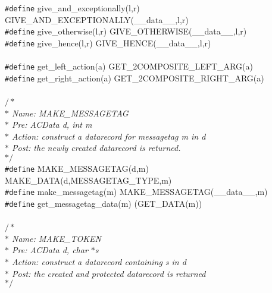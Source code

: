 \begin{flushleft}
{\tt \#define} give\_and\_exceptionally(l,r) GIVE\_AND\_EXCEPTIONALLY(\_\_data\_\_,l,r)\mbox{}\\
{\tt \#define} give\_otherwise(l,r) GIVE\_OTHERWISE(\_\_data\_\_,l,r)\mbox{}\\
{\tt \#define} give\_hence(l,r) GIVE\_HENCE(\_\_data\_\_,l,r)\mbox{}\\
\mbox{}\\
{\tt \#define} get\_left\_action(a) GET\_2COMPOSITE\_LEFT\_ARG(a)\mbox{}\\
{\tt \#define} get\_right\_action(a) GET\_2COMPOSITE\_RIGHT\_ARG(a)\mbox{}\\
\mbox{}\\
{$/\ast$\it{}\mbox{}\\
\hspace*{1\indentation}$\ast$ Name: MAKE\_MESSAGETAG\mbox{}\\
\hspace*{1\indentation}$\ast$ Pre: ACData d, int m\mbox{}\\
\hspace*{1\indentation}$\ast$ Action: construct a datarecord for messagetag m in d\mbox{}\\
\hspace*{1\indentation}$\ast$ Post: the newly created datarecord is returned.\mbox{}\\
\hspace*{1\indentation}$\ast/$}\mbox{}\\
{\tt \#define} MAKE\_MESSAGETAG(d,m) MAKE\_DATA(d,MESSAGETAG\_TYPE,m)\mbox{}\\
{\tt \#define} make\_messagetag(m) MAKE\_MESSAGETAG(\_\_data\_\_,m)\mbox{}\\
{\tt \#define} get\_messagetag\_data(m) (GET\_DATA(m))\mbox{}\\
\mbox{}\\
{$/\ast$\it{}\mbox{}\\
\hspace*{1\indentation}$\ast$ Name: MAKE\_TOKEN\mbox{}\\
\hspace*{1\indentation}$\ast$ Pre: ACData d, char $\ast$s\mbox{}\\
\hspace*{1\indentation}$\ast$ Action: construct a datarecord containing s in d\mbox{}\\
\hspace*{1\indentation}$\ast$ Post: the created and protected datarecord is returned\mbox{}\\
\hspace*{1\indentation}$\ast/$}\mbox{}\\

\end{flushleft}
